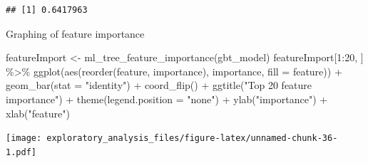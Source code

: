 \documentclass[
]{article}
\newenvironment{Shaded}{\begin{snugshade}}{\end{snugshade}}
\newcommand{\AttributeTok}[1]{\textcolor[rgb]{0.77,0.63,0.00}{#1}}
\newcommand{\DecValTok}[1]{\textcolor[rgb]{0.00,0.00,0.81}{#1}}
\newcommand{\FunctionTok}[1]{\textcolor[rgb]{0.00,0.00,0.00}{#1}}
\newcommand{\NormalTok}[1]{#1}
\newcommand{\OtherTok}[1]{\textcolor[rgb]{0.56,0.35,0.01}{#1}}
\newcommand{\SpecialCharTok}[1]{\textcolor[rgb]{0.00,0.00,0.00}{#1}}
\newcommand{\StringTok}[1]{\textcolor[rgb]{0.31,0.60,0.02}{#1}}
\begin{document}
\begin{verbatim}
## [1] 0.6417963
\end{verbatim}

Graphing of feature importance

\begin{Shaded}
\begin{Highlighting}[]
\NormalTok{featureImport }\OtherTok{\textless{}{-}} \FunctionTok{ml\_tree\_feature\_importance}\NormalTok{(gbt\_model)}
\NormalTok{featureImport[}\DecValTok{1}\SpecialCharTok{:}\DecValTok{20}\NormalTok{, ] }\SpecialCharTok{\%\textgreater{}\%}
    \FunctionTok{ggplot}\NormalTok{(}\FunctionTok{aes}\NormalTok{(}\FunctionTok{reorder}\NormalTok{(feature, importance), importance,}
        \AttributeTok{fill =}\NormalTok{ feature)) }\SpecialCharTok{+} \FunctionTok{geom\_bar}\NormalTok{(}\AttributeTok{stat =} \StringTok{"identity"}\NormalTok{) }\SpecialCharTok{+}
    \FunctionTok{coord\_flip}\NormalTok{() }\SpecialCharTok{+} \FunctionTok{ggtitle}\NormalTok{(}\StringTok{"Top 20 feature importance"}\NormalTok{) }\SpecialCharTok{+}
    \FunctionTok{theme}\NormalTok{(}\AttributeTok{legend.position =} \StringTok{"none"}\NormalTok{) }\SpecialCharTok{+} \FunctionTok{ylab}\NormalTok{(}\StringTok{"importance"}\NormalTok{) }\SpecialCharTok{+}
    \FunctionTok{xlab}\NormalTok{(}\StringTok{"feature"}\NormalTok{)}
\end{Highlighting}
\end{Shaded}

\texttt{[image: exploratory\_analysis\_files/figure-latex/unnamed-chunk-36-1.pdf]}
\end{document}
